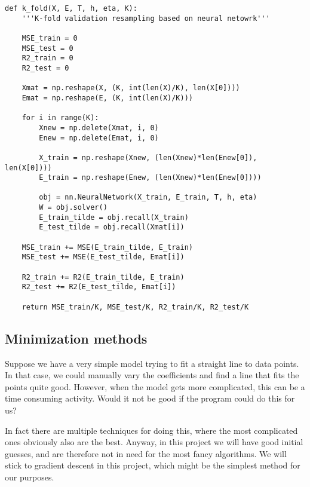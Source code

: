 \lstset{basicstyle=\scriptsize}
\begin{lstlisting}
def k_fold(X, E, T, h, eta, K):
	'''K-fold validation resampling based on neural netowrk'''
	
	MSE_train = 0
	MSE_test = 0
	R2_train = 0
	R2_test = 0
	
	Xmat = np.reshape(X, (K, int(len(X)/K), len(X[0])))
	Emat = np.reshape(E, (K, int(len(X)/K)))
	
	for i in range(K):
		Xnew = np.delete(Xmat, i, 0)
		Enew = np.delete(Emat, i, 0)
		
		X_train = np.reshape(Xnew, (len(Xnew)*len(Enew[0]), len(X[0])))
		E_train = np.reshape(Enew, (len(Xnew)*len(Enew[0])))
		
		obj = nn.NeuralNetwork(X_train, E_train, T, h, eta)
		W = obj.solver()
		E_train_tilde = obj.recall(X_train)
		E_test_tilde = obj.recall(Xmat[i])
	
	MSE_train += MSE(E_train_tilde, E_train)
	MSE_test += MSE(E_test_tilde, Emat[i])
	
	R2_train += R2(E_train_tilde, E_train)
	R2_test += R2(E_test_tilde, Emat[i])
	
	return MSE_train/K, MSE_test/K, R2_train/K, R2_test/K
\end{lstlisting}

\subsection{Minimization methods}\label{sec:minimization}
Suppose we have a very simple model trying to fit a straight line to data points. In that case, we could manually vary the coefficients and find a line that fits the points quite good. However, when the model gets more complicated, this can be a time consuming activity. Would it not be good if the program could do this for us?

In fact there are multiple techniques for doing this, where the most complicated ones obviously also are the best. Anyway, in this project we will have good initial guesses, and are therefore not in need for the most fancy algorithms. We will stick to gradient descent in this project, which might be the simplest method for our purposes.

